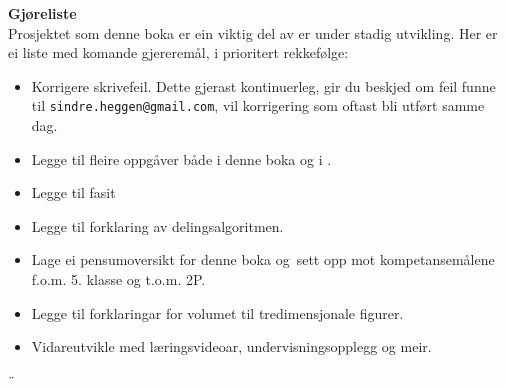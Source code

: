 \newpage
\textbf{Gjøreliste} \\
Prosjektet som denne boka er ein viktig del av er under stadig utvikling. Her er ei liste med komande gjereremål, i prioritert rekkefølge:
\begin{itemize}
	\item Korrigere skrivefeil. Dette gjerast kontinuerleg, gir du beskjed om feil funne til {\tt sindre.heggen@gmail.com}, vil korrigering som oftast bli utført samme dag.
	\item Legge til fleire oppgåver både i denne boka og i \mb. 
	\item Legge til fasit 
	\item Legge til forklaring av delingsalgoritmen.
	\item Lage ei pensumoversikt for denne boka og \mb\,sett opp mot kompetansemålene f.o.m. 5. klasse og t.o.m. 2P.
	\item Legge til forklaringar for volumet til tredimensjonale figurer.
	\item Vidareutvikle  med læringsvideoar, undervisningsopplegg og meir. 
\end{itemize}¨
\newpage

